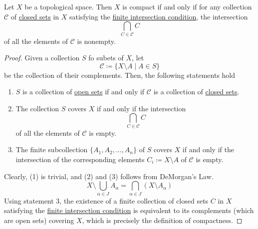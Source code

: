   \begin{theorem}
    \label{thm:compactness-via-the-finite-intersection-property}
    Let $X$ be a topological space. Then $X$ is compact if and only if for any collection $\mathcal{C}$ of \hyperref[def:closed]{closed sets} in $X$ satisfying the \hyperref[def:finite-intersection-condition]{finite intersection condition}, the intersection 
    \begin{equation}
      \bigcap_{C \in \mathcal{C}} C
    \end{equation}
    of all the elements of $\mathcal{C}$ is nonempty. 
  \end{theorem}
  \begin{proof}
    Given a collection $S$ fo subets of $X$, let 
    \begin{equation}
      \mathcal{C} \coloneqq \{X \setminus A \; | \; A \in S\}
    \end{equation}
    be the collection of their complements. Then, the following statements hold 
    \begin{enumerate}
      \item $S$ is a collection of \hyperref[def:open-set]{open sets} if and only if $\mathcal{C}$ is a collection of \hyperref[def:closed]{closed sets}. 
      \item The collection $S$ covers $X$ if and only if the intersection 
      \begin{equation}
        \bigcap_{C \in \mathcal{C}} C
      \end{equation}
      of all the elements of $\mathcal{C}$ is empty. 

      \item The finite subcollection $\{A_1, A_2, \ldots , A_n\}$ of $S$ covers $X$ if and only if the intersection of the corresponding elements $C_i \coloneqq X \setminus A$ of $\mathcal{C}$ is empty. 
    \end{enumerate}
    Clearly, (1) is trivial, and (2) and (3) follows from DeMorgan's Law. 
    \begin{equation}
      X \setminus \bigcup_{\alpha \in J} A_\alpha = \bigcap_{\alpha \in J} (X \setminus A_\alpha)
    \end{equation}
    Using statement 3, the existence of a finite collection of closed sets $C$ in $X$ satisfying the \hyperref[def:finite-intersection-condition]{finite intersection condition} is equivalent to its complements (which are open sets) covering $X$, which is precisely the definition of compactness. 
  \end{proof}

